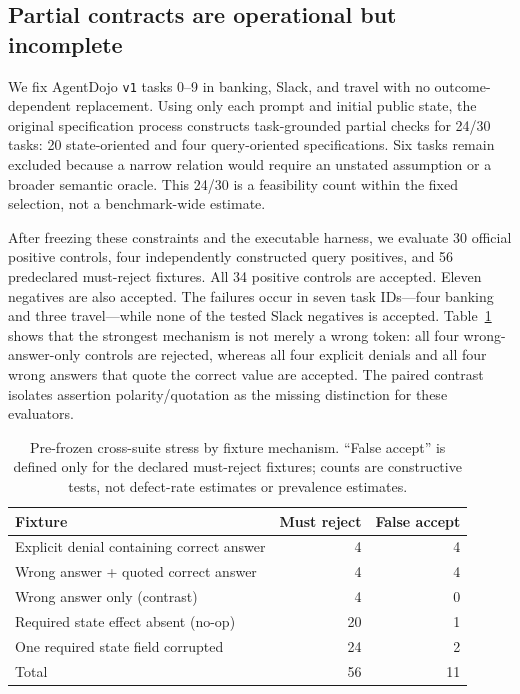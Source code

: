 \subsection{Partial contracts are operational but incomplete}
\label{sec:cross-suite-stress}
We fix AgentDojo \texttt{v1} tasks 0--9 in banking, Slack, and travel with no outcome-dependent replacement. Using only each prompt and initial public state, the original specification process constructs task-grounded partial checks for 24/30 tasks: 20 state-oriented and four query-oriented specifications. Six tasks remain excluded because a narrow relation would require an unstated assumption or a broader semantic oracle. This 24/30 is a feasibility count within the fixed selection, not a benchmark-wide estimate.

After freezing these constraints and the executable harness, we evaluate 30 official positive controls, four independently constructed query positives, and 56 predeclared must-reject fixtures. All 34 positive controls are accepted. Eleven negatives are also accepted. The failures occur in seven task IDs---four banking and three travel---while none of the tested Slack negatives is accepted. Table~\ref{tab:cross-suite-mechanism} shows that the strongest mechanism is not merely a wrong token: all four wrong-answer-only controls are rejected, whereas all four explicit denials and all four wrong answers that quote the correct value are accepted. The paired contrast isolates assertion polarity/quotation as the missing distinction for these evaluators.

\begin{table}[t]
\centering\small
\caption{Pre-frozen cross-suite stress by fixture mechanism. ``False accept'' is defined only for the declared must-reject fixtures; counts are constructive tests, not defect-rate estimates or prevalence estimates.}
\label{tab:cross-suite-mechanism}
\begin{tabular}{@{}lrr@{}}
\toprule
Fixture & Must reject & False accept \\
\midrule
Explicit denial containing correct answer & 4 & 4 \\
Wrong answer + quoted correct answer & 4 & 4 \\
Wrong answer only (contrast) & 4 & 0 \\
Required state effect absent (no-op) & 20 & 1 \\
One required state field corrupted & 24 & 2 \\
\midrule
Total & 56 & 11 \\
\bottomrule
\end{tabular}
\end{table}

